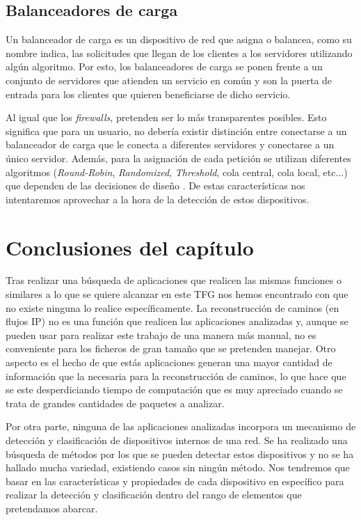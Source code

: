 \documentclass[twoside, 12pt]{epstfg}
\begin{document}
\subsection{Balanceadores de carga}
Un balanceador de carga es un dispositivo de red que asigna o balancea, como su nombre indica, las solicitudes que llegan de los clientes a los servidores utilizando algún algoritmo. Por esto, los balanceadores de carga se ponen frente a un conjunto de servidores que atienden un servicio en común y son la puerta de entrada para los clientes que quieren beneficiarse de dicho servicio. 

Al igual que los \textit{firewalls}, pretenden ser lo más transparentes posibles. Esto significa que para un usuario, no debería existir distinción entre conectarse a un balanceador de carga que le conecta a diferentes servidores y conectarse a un único servidor. Además, para la asignación de cada petición se utilizan diferentes algoritmos (\textit{Round-Robin}, \textit{Randomized}, \textit{Threshold}, cola central, cola local, etc...) que dependen de las decisiones de diseño \cite{Wadhwa2014}. De estas características nos intentaremos aprovechar a la hora de la detección de estos dispositivos. 

\section{Conclusiones del capítulo}
Tras realizar una búsqueda de aplicaciones que realicen las mismas funciones o similares a lo que se quiere alcanzar en este TFG nos hemos encontrado con que no existe ninguna lo realice específicamente. La reconstrucción de caminos (en flujos IP) no es una función que realicen las aplicaciones analizadas y, aunque se pueden usar para realizar este trabajo de una manera más manual, no es conveniente para los ficheros de gran tamaño que se pretenden manejar. Otro aspecto es el hecho de que estás aplicaciones generan una mayor cantidad de información que la necesaria para la reconstrucción de caminos, lo que hace que se este desperdiciando tiempo de computación que es muy apreciado cuando se trata de grandes cantidades de paquetes a analizar.

Por otra parte, ninguna de las aplicaciones analizadas incorpora un mecanismo de detección y clasificación de dispositivos internos de una red. Se ha realizado una búsqueda de métodos por los que se pueden detectar estos dispositivos y no se ha hallado mucha variedad, existiendo casos sin ningún método. Nos tendremos que basar en las características y propiedades de cada dispositivo en específico para realizar la detección y clasificación dentro del rango de elementos que pretendamos abarcar.
\end{document}
